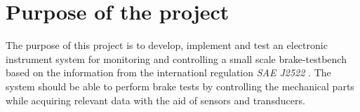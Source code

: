 \section{Purpose of the project}\label{sec:purpose}
	The purpose of this project is to develop, implement and test an electronic instrument system for monitoring and controlling a small scale brake-testbench based on the information from the internationl regulation \textit{SAE J2522} \cite{sae}. The system should be able to perform brake tests by controlling the mechanical parts while acquiring relevant data with the aid of sensors and transducers.